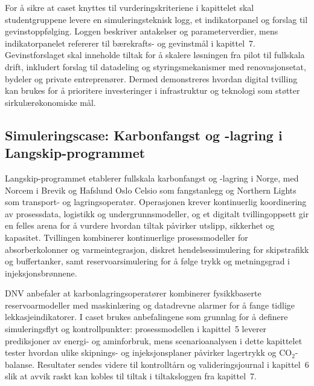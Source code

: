 For å sikre at caset knyttes til vurderingskriteriene i kapittelet skal studentgruppene levere en simuleringsteknisk logg, et indikatorpanel og forslag til gevinstoppfølging. Loggen beskriver antakelser og parameterverdier, mens indikatorpanelet refererer til bærekrafts- og gevinstmål i kapittel~7. Gevinstforslaget skal inneholde tiltak for å skalere løsningen fra pilot til fullskala drift, inkludert forslag til datadeling og styringsmekanismer med renovasjonsetat, bydeler og private entreprenører. Dermed demonstreres hvordan digital tvilling kan brukes for å prioritere investeringer i infrastruktur og teknologi som støtter sirkulærøkonomiske mål.

\subsection{Simuleringscase: Karbonfangst og -lagring i Langskip-programmet}
Langskip-programmet etablerer fullskala karbonfangst og -lagring i Norge, med Norcem i Brevik og Hafslund Oslo Celsio som fangstanlegg og Northern Lights som transport- og lagringsoperatør.\citep{oed2023langskip,northernlights2024readiness} Operasjonen krever kontinuerlig koordinering av prosessdata, logistikk og undergrunnsmodeller, og et digitalt tvillingoppsett gir en felles arena for å vurdere hvordan tiltak påvirker utslipp, sikkerhet og kapasitet. Tvillingen kombinerer kontinuerlige prosessmodeller for absorberkolonner og varmeintegrasjon, diskret hendelsessimulering for skipstrafikk og buffertanker, samt reservoarsimulering for å følge trykk og metningsgrad i injeksjonsbrønnene.

DNV anbefaler at karbonlagringsoperatører kombinerer fysikkbaserte reservoarmodeller med maskinlæring og datadrevne alarmer for å fange tidlige lekkasjeindikatorer.\citep{dnv2023ccsmonitoring} I caset brukes anbefalingene som grunnlag for å definere simuleringsflyt og kontrollpunkter: prosessmodellen i kapittel~5 leverer prediksjoner av energi- og aminforbruk, mens scenarioanalysen i dette kapittelet tester hvordan ulike skipnings- og injeksjonsplaner påvirker lagertrykk og CO$_2$-balanse. Resultater sendes videre til kontrolltårn og valideringsjournal i kapittel~6 slik at avvik raskt kan kobles til tiltak i tiltaksloggen fra kapittel~7.

